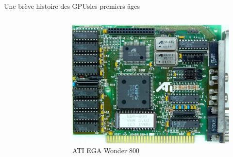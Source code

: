 \documentclass[11pt,mathserif]{beamer}
\begin{document}
\begin{frame}{Une brève histoire des GPUs}{les premiers âges}
\begin{columns}[t]
\begin{figure}[htbp]
    \end{figure}
\begin{figure}[htbp]
  \includegraphics[width=0.8\linewidth]{fig/ati_ega.png}
      \caption{\tiny ATI EGA Wonder 800}
    \end{figure}
  \end{columns}
\end{frame}
\end{document}
